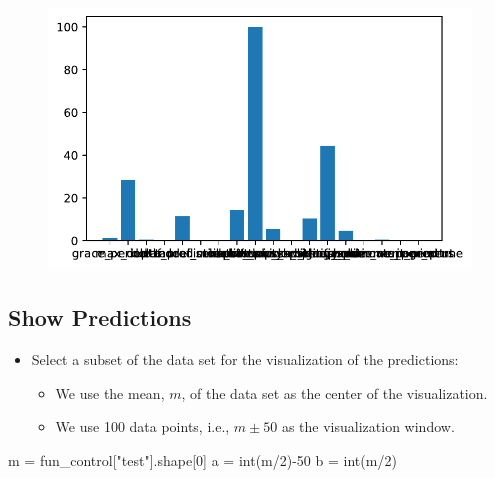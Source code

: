 \documentclass[
  letterpaper,
  DIV=11,
  numbers=noendperiod]{scrreprt}
\newenvironment{Shaded}{\begin{snugshade}}{\end{snugshade}}
\newcommand{\BuiltInTok}[1]{\textcolor[rgb]{0.00,0.23,0.31}{#1}}
\newcommand{\DecValTok}[1]{\textcolor[rgb]{0.68,0.00,0.00}{#1}}
\newcommand{\NormalTok}[1]{\textcolor[rgb]{0.00,0.23,0.31}{#1}}
\newcommand{\OperatorTok}[1]{\textcolor[rgb]{0.37,0.37,0.37}{#1}}
\newcommand{\StringTok}[1]{\textcolor[rgb]{0.13,0.47,0.30}{#1}}
\providecommand{\tightlist}{%
  \setlength{\itemsep}{0pt}\setlength{\parskip}{0pt}}\usepackage{longtable,booktabs,array}
\begin{document}
\begin{figure}[H]

{\centering \includegraphics{024_spot_hpt_river_friedman_hatr_files/figure-pdf/cell-29-output-1.pdf}

}

\end{figure}

\hypertarget{show-predictions}{%
\subsection{Show Predictions}\label{show-predictions}}

\begin{itemize}
\tightlist
\item
  Select a subset of the data set for the visualization of the
  predictions:

  \begin{itemize}
  \tightlist
  \item
    We use the mean, \(m\), of the data set as the center of the
    visualization.
  \item
    We use 100 data points, i.e., \(m \pm 50\) as the visualization
    window.
  \end{itemize}
\end{itemize}

\begin{Shaded}
\begin{Highlighting}[]
\NormalTok{m }\OperatorTok{=}\NormalTok{ fun\_control[}\StringTok{"test"}\NormalTok{].shape[}\DecValTok{0}\NormalTok{]}
\NormalTok{a }\OperatorTok{=} \BuiltInTok{int}\NormalTok{(m}\OperatorTok{/}\DecValTok{2}\NormalTok{)}\OperatorTok{{-}}\DecValTok{50}
\NormalTok{b }\OperatorTok{=} \BuiltInTok{int}\NormalTok{(m}\OperatorTok{/}\DecValTok{2}\NormalTok{)}
\end{Highlighting}
\end{Shaded}
\end{document}
